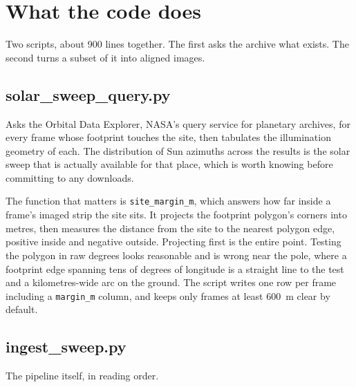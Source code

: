 \documentclass[11pt]{article}
\begin{document}
\section{What the code does}

Two scripts, about 900 lines together. The first asks the archive what exists. The
second turns a subset of it into aligned images.

\subsection{solar\_sweep\_query.py}

Asks the Orbital Data Explorer, NASA's query service for planetary archives, for every
frame whose footprint touches the site, then tabulates the illumination geometry of
each. The distribution of Sun azimuths across the results is the solar sweep that is
actually available for that place, which is worth knowing before committing to any
downloads.

The function that matters is \texttt{site\_margin\_m}, which answers how far inside a
frame's imaged strip the site sits. It projects the footprint polygon's corners into
metres, then measures the distance from the site to the nearest polygon edge, positive
inside and negative outside. Projecting first is the entire point. Testing the polygon
in raw degrees looks reasonable and is wrong near the pole, where a footprint edge
spanning tens of degrees of longitude is a straight line to the test and a
kilometres-wide arc on the ground. The script writes one row per frame including a
\texttt{margin\_m} column, and keeps only frames at least \SI{600}{\meter} clear by
default.

\subsection{ingest\_sweep.py}

The pipeline itself, in reading order.
\end{document}
